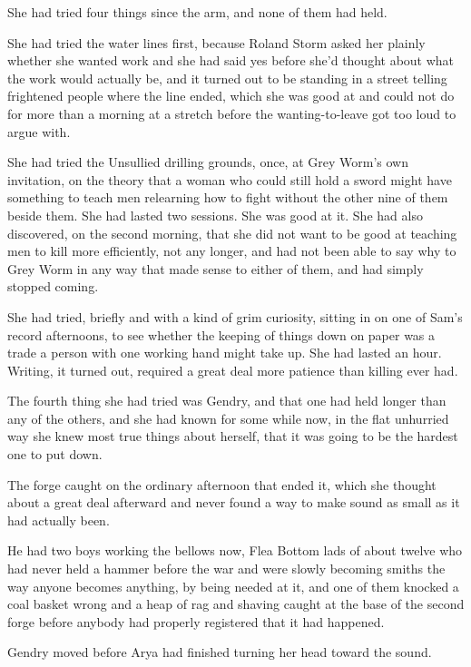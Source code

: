 She had tried four things since the arm, and none of them had held.

She had tried the water lines first, because Roland Storm asked her plainly whether she wanted work and she had said yes before she’d thought about what the work would actually be, and it turned out to be standing in a street telling frightened people where the line ended, which she was good at and could not do for more than a morning at a stretch before the wanting-to-leave got too loud to argue with.

She had tried the Unsullied drilling grounds, once, at Grey Worm’s own invitation, on the theory that a woman who could still hold a sword might have something to teach men relearning how to fight without the other nine of them beside them. She had lasted two sessions. She was good at it. She had also discovered, on the second morning, that she did not want to be good at teaching men to kill more efficiently, not any longer, and had not been able to say why to Grey Worm in any way that made sense to either of them, and had simply stopped coming.

She had tried, briefly and with a kind of grim curiosity, sitting in on one of Sam’s record afternoons, to see whether the keeping of things down on paper was a trade a person with one working hand might take up. She had lasted an hour. Writing, it turned out, required a great deal more patience than killing ever had.

The fourth thing she had tried was Gendry, and that one had held longer than any of the others, and she had known for some while now, in the flat unhurried way she knew most true things about herself, that it was going to be the hardest one to put down.

\sceneBreak

The forge caught on the ordinary afternoon that ended it, which she thought about a great deal afterward and never found a way to make sound as small as it had actually been.

He had two boys working the bellows now, Flea Bottom lads of about twelve who had never held a hammer before the war and were slowly becoming smiths the way anyone becomes anything, by being needed at it, and one of them knocked a coal basket wrong and a heap of rag and shaving caught at the base of the second forge before anybody had properly registered that it had happened.

Gendry moved before Arya had finished turning her head toward the sound.

